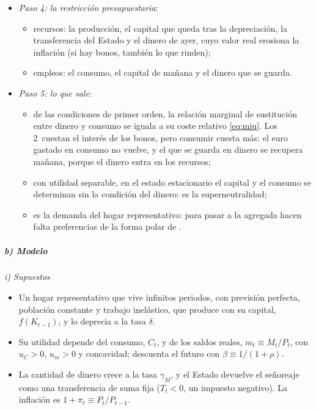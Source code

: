 \documentclass[11pt]{article}
\begin{document}
\begin{anotaciones}
\begin{itemize}
\begin{itemize}
  \item su utilidad es creciente y estrictamente cóncava en el consumo y en los saldos reales: con el consumo dado, más dinero da más utilidad. El modelo no dice para qué sirve el dinero, pero sí que es un depósito de valor, porque el de ayer es un recurso de hoy.
  \end{itemize}
\item \emph{Paso 4: la restricción presupuestaria}:
  \begin{itemize}
  \item recursos: la producción, el capital que queda tras la depreciación, la transferencia del Estado y el dinero de ayer, cuyo valor real erosiona la inflación (si hay bonos, también lo que rinden);
  \item empleos: el consumo, el capital de mañana y el dinero que se guarda.
  \end{itemize}
\item \emph{Paso 5: lo que sale}:
  \begin{itemize}
  \item de las condiciones de primer orden, la relación marginal de sustitución entre dinero y consumo se iguala a su coste relativo \eqref{eq:miu}. Los 2~cuestan el interés de los bonos, pero consumir cuesta más: el euro gastado en consumo no vuelve, y el que se guarda en dinero se recupera mañana, porque el dinero entra en los recursos;
  \item con utilidad separable, en el estado estacionario el capital y el consumo se determinan sin la condición del dinero: es la superneutralidad;
  \item es la demanda del hogar representativo: para pasar a la agregada hacen falta preferencias de la forma polar de  .
  \end{itemize}
\end{itemize}
\end{anotaciones}

\subparagraph{b) Modelo}

\hspace*{3.6em}\emph{i) Supuestos}

\begin{itemize}
\item Un hogar representativo que vive infinitos periodos, con previsión perfecta, población constante y trabajo inelástico, que produce con su capital, $f(K_{t-1})$, y lo deprecia a la tasa $\delta$.
\item Su utilidad depende del consumo, $C_t$, y de los saldos reales, $m_t\equiv M_t/P_t$, con $u_C>0$, $u_m>0$ y concavidad; descuenta el futuro con $\beta\equiv 1/(1+\rho)$.
\item La cantidad de dinero crece a la tasa $\gamma_M$, y el Estado devuelve el señoreaje como una transferencia de suma fija ($T_t<0$, un impuesto negativo). La inflación es $1+\pi_t\equiv P_t/P_{t-1}$.
\end{itemize}
\end{document}
